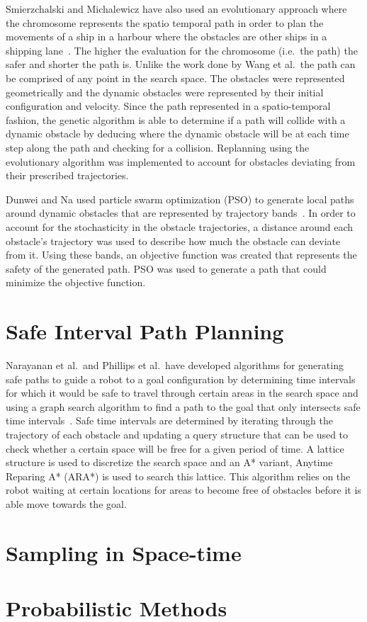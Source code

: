 Smierzchalski and Michalewicz have also used an evolutionary approach where the
chromosome represents the spatio temporal path in order to plan the movements
of a ship in a harbour where the obstacles are other ships in a shipping
lane~\cite{smierzchalski2005path}. The higher the evaluation for the chromosome
(i.e.\ the path) the safer and shorter the path is. Unlike the work done by
Wang et al.\, the path can be comprised of any point in the search space.  The
obstacles were represented geometrically and the dynamic obstacles were
represented by their initial configuration and velocity.  Since the path
represented in a spatio-temporal fashion, the genetic algorithm is able to
determine if a path will collide with a dynamic obstacle by deducing where the
dynamic obstacle will be at each time step along the path and checking for a
collision.  Replanning using the evolutionary algorithm was implemented to
account for obstacles deviating from their prescribed trajectories.

Dunwei and Na used particle swarm optimization (PSO) to generate local paths
around dynamic obstacles that are represented by trajectory
bands~\cite{dunwei2011local}.  In order to account for the stochasticity in the
obstacle trajectories, a distance around each obstacle's trajectory was used to
describe how much the obstacle can deviate from it. Using these bands, an
objective function was created that represents the safety of the generated
path. PSO was used to generate a path that could minimize the objective
function.

\section{Safe Interval Path Planning}

Narayanan et al.\ and Phillips et al.\ have developed algorithms for generating
safe paths to guide a robot to a goal configuration by determining time
intervals for which it would be safe to travel through certain areas in the
search space and using a graph search algorithm to find a path to the goal that
only intersects safe time intervals~\cite{asipp, sipp}.  Safe time intervals
are determined by iterating through the trajectory of each obstacle and
updating a query structure that can be used to check whether a certain space
will be free for a given period of time. A lattice structure is used to
discretize the search space and an A* variant, Anytime Reparing A* (ARA*) is
used to search this lattice. This algorithm relies on the robot waiting at
certain locations for areas to become free of obstacles before it is able move
towards the goal.

\section{Sampling in Space-time}

\cite{van2006anytime} \cite{hsu2002randomized}

\section{Probabilistic Methods}

\cite{jensen2003motion} \cite{rodriguez2007framework}



